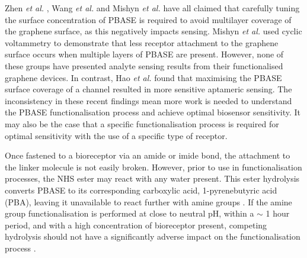 \documentclass[
  a4paper,
]{scrbook}
\begin{document}
Zhen \emph{et al.} \autocite{Zhen2018}, Wang \emph{et al.}
\autocite{Wang2020} and Mishyn \emph{et al.} \autocite{Mishyn2022} have
all claimed that carefully tuning the surface concentration of PBASE is
required to avoid multilayer coverage of the graphene surface, as this
negatively impacts sensing. Mishyn \emph{et al.} \autocite{Mishyn2022}
used cyclic voltammetry to demonstrate that less receptor attachment to
the graphene surface occurs when multiple layers of PBASE are present.
However, none of these groups have presented analyte sensing results
from their functionalised graphene devices. In contrast, Hao \emph{et
al.} \autocite{Hao2020} found that maximising the PBASE surface coverage
of a channel resulted in more sensitive aptameric sensing. The
inconsistency in these recent findings mean more work is needed to
understand the PBASE functionalisation process and achieve optimal
biosensor sensitivity. It may also be the case that a specific
functionalisation process is required for optimal sensitivity with the
use of a specific type of receptor.

Once fastened to a bioreceptor via an amide or imide bond, the
attachment to the linker molecule is not easily broken. However, prior
to use in functionalisation processes, the NHS ester may react with any
water present. This ester hydrolysis converts PBASE to its corresponding
carboxylic acid, 1-pyrenebutyric acid (PBA), leaving it unavailable to
react further with amine groups
\autocite{Hermanson2013-3,Hermanson2013-5,Mishyn2022}. If the amine
group functionalisation is performed at close to neutral pH, within a
\(\sim\) 1 hour period, and with a high concentration of bioreceptor
present, competing hydrolysis should not have a significantly adverse
impact on the functionalisation process \autocite{Hermanson2013-3}.
\end{document}

